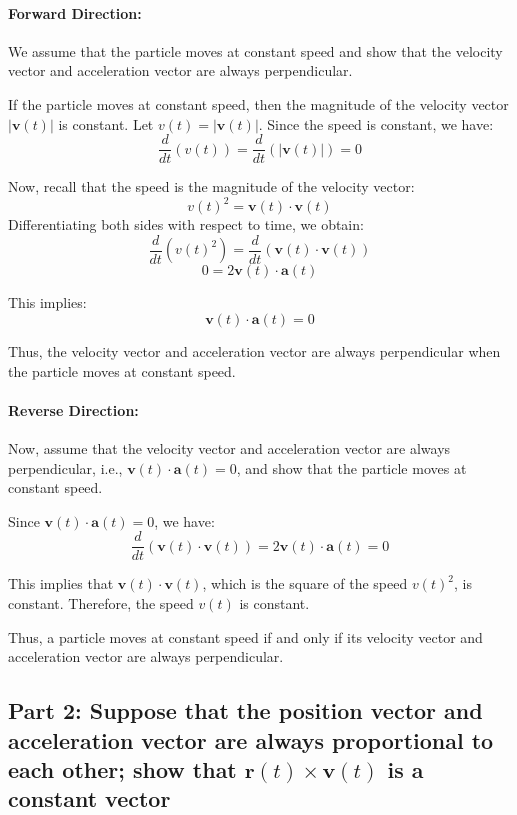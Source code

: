 \documentclass[11pt]{article}
\begin{document}
\paragraph{Forward Direction:}
We assume that the particle moves at constant speed and show that the velocity vector and acceleration vector are always perpendicular.

If the particle moves at constant speed, then the magnitude of the velocity vector \( |\mathbf{v}(t)| \) is constant. Let \( v(t) = |\mathbf{v}(t)| \). Since the speed is constant, we have:
\[
\frac{d}{dt} \left( v(t) \right) = \frac{d}{dt} \left( |\mathbf{v}(t)| \right) = 0
\]

Now, recall that the speed is the magnitude of the velocity vector:
\[
v(t)^2 = \mathbf{v}(t) \cdot \mathbf{v}(t)
\]
Differentiating both sides with respect to time, we obtain:
\[
\frac{d}{dt} \left( v(t)^2 \right) = \frac{d}{dt} \left( \mathbf{v}(t) \cdot \mathbf{v}(t) \right)
\]
\[
0 = 2 \mathbf{v}(t) \cdot \mathbf{a}(t)
\]

This implies:
\[
\mathbf{v}(t) \cdot \mathbf{a}(t) = 0
\]

Thus, the velocity vector and acceleration vector are always perpendicular when the particle moves at constant speed.

\paragraph{Reverse Direction:}
Now, assume that the velocity vector and acceleration vector are always perpendicular, i.e., \( \mathbf{v}(t) \cdot \mathbf{a}(t) = 0 \), and show that the particle moves at constant speed.

Since \( \mathbf{v}(t) \cdot \mathbf{a}(t) = 0 \), we have:
\[
\frac{d}{dt} \left( \mathbf{v}(t) \cdot \mathbf{v}(t) \right) = 2 \mathbf{v}(t) \cdot \mathbf{a}(t) = 0
\]

This implies that \( \mathbf{v}(t) \cdot \mathbf{v}(t) \), which is the square of the speed \( v(t)^2 \), is constant. Therefore, the speed \( v(t) \) is constant.

Thus, a particle moves at constant speed if and only if its velocity vector and acceleration vector are always perpendicular.

\newpage

\subsection{Part 2: Suppose that the position vector and acceleration vector are always proportional to each other; show that \( \mathbf{r}(t) \times \mathbf{v}(t) \) is a constant vector}
\end{document}
